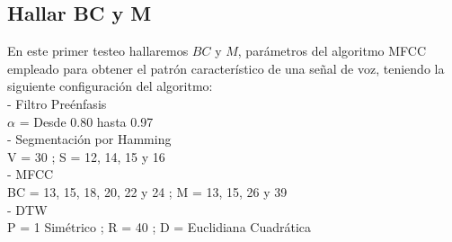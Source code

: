 \subsection{Hallar BC y M}
En este primer testeo hallaremos $BC$ y $M$, parámetros del algoritmo MFCC empleado para obtener el patrón característico de una señal de voz, teniendo la siguiente configuración del algoritmo:\\
- Filtro Preénfasis \\
\hspace*{1cm} $\alpha$ = Desde 0.80 hasta 0.97 \\
- Segmentación por Hamming\\
\hspace*{1cm} V = 30 ; \qquad S = 12, 14, 15 y 16\\
- MFCC\\
\hspace*{1cm} BC = 13, 15, 18, 20, 22 y 24 ; \qquad M = 13, 15, 26 y 39\\
- DTW\\
\hspace*{1cm} P = 1 Simétrico ; \qquad R = 40 ; \qquad D = Euclidiana Cuadrática

